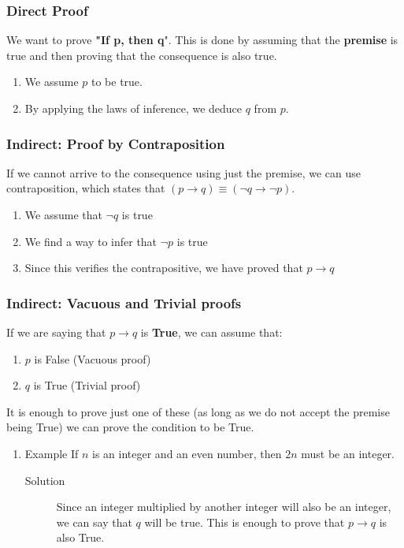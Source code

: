 \documentclass[11pt]{article}
\begin{document}
\subsubsection{Direct Proof}
\label{sec:org4d5c5ad}
We want to prove \textbf{"If p, then q}". This is done by assuming that the \textbf{premise} is true and then proving that the consequence is also true.

\begin{enumerate}
\item We assume \(p\) to be true.
\item By applying the laws of inference, we deduce \(q\) from \(p\).
\end{enumerate}
\subsubsection{Indirect: Proof by Contraposition}
\label{sec:org4a2fe31}
If we cannot arrive to the consequence using just the premise, we can use contraposition, which states that \((p \to q) \equiv (\neg q \to \neg p)\).

\begin{enumerate}
\item We assume that \(\neg q\) is true
\item We find a way to infer that \(\neg p\) is true
\item Since this verifies the contrapositive, we have proved that \(p \to q\)
\end{enumerate}

\subsubsection{Indirect: Vacuous and Trivial proofs}
\label{sec:orgf8b3699}
If we are saying that \(p \to q\) is \textbf{True}, we can assume that:
\begin{enumerate}
\item \(p\) is False (Vacuous proof)
\item \(q\) is True (Trivial proof)
\end{enumerate}

It is enough to prove just one of these (as long as we do not accept the premise being True) we can prove the condition to be True.
\begin{enumerate}
\item Example
\label{sec:org2d59bdd}
If \(n\) is an integer and an even number, then \(2n\) must be an integer.
\begin{description}
\item[{Solution}] Since an integer multiplied by another integer will also be an integer, we can say that \(q\) will be true. This is enough to prove that \(p \to q\) is also True.
\end{description}
\end{enumerate}
\end{document}
